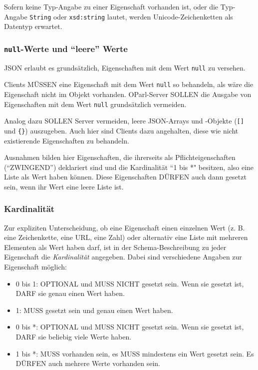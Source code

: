 \documentclass[,a4paper]{article}
\begin{document}
Sofern keine Typ-Angabe zu einer Eigenschaft vorhanden ist, oder die
Typ-Angabe \texttt{String} oder \texttt{xsd:string} lautet, werden
Unicode-Zeichenketten als Datentyp erwartet.

\subsubsection{\texttt{null}-Werte und ``leere''
Werte}\label{null-werte-und-leere-werte}

JSON erlaubt es grundsätzlich, Eigenschaften mit dem Wert \texttt{null}
zu versehen.

Clients MÜSSEN eine Eigenschaft mit dem Wert \texttt{null} so behandeln,
als wäre die Eigenschaft nicht im Objekt vorhanden. OParl-Server SOLLEN
die Ausgabe von Eigenschaften mit dem Wert \texttt{null} grundsätzlich
vermeiden.

Analog dazu SOLLEN Server vermeiden, leere JSON-Arrays und -Objekte
(\texttt{{[}{]}} und \texttt{\{\}}) auszugeben. Auch hier sind Clients
dazu angehalten, diese wie nicht existierende Eigenschaften zu
behandeln.

Ausnahmen bilden hier Eigenschaften, die ihrerseits als
Pflichteigenschaften (``ZWINGEND'') deklariert sind und die Kardinalität
``1 bis *" besitzen, also eine Liste als Wert haben können. Diese
Eigenschaften DÜRFEN auch dann gesetzt sein, wenn ihr Wert eine leere
Liste ist.

\subsubsection{Kardinalität}\label{kardinalituxe4t}

Zur expliziten Unterscheidung, ob eine Eigenschaft einen einzelnen Wert
(z. B. eine Zeichenkette, eine URL, eine Zahl) oder alternativ eine
Liste mit mehreren Elementen als Wert haben darf, ist in der
Schema-Beschreibung zu jeder Eigenschaft die \emph{Kardinalität}
angegeben. Dabei sind verschiedene Angaben zur Eigenschaft möglich:

\begin{itemize}
\item
  0 bis 1: OPTIONAL und MUSS NICHT gesetzt sein. Wenn sie gesetzt ist,
  DARF sie genau einen Wert haben.
\item
  1: MUSS gesetzt sein und genau einen Wert haben.
\item
  0 bis *: OPTIONAL und MUSS NICHT gesetzt sein. Wenn sie gesetzt ist,
  DARF sie beliebig viele Werte haben.
\item
  1 bis *: MUSS vorhanden sein, es MUSS mindestens ein Wert gesetzt
  sein. Es DÜRFEN auch mehrere Werte vorhanden sein.
\end{itemize}
\end{document}
